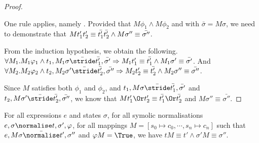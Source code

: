 \begin{proof}
{  }

  {One rule applies, namely .
  Provided that $M\phi_1\land M\phi_2$ and  with $\bar{\sigma}=M\sigma$,
  we need to demonstrate that $M t_1'\relax t_2'\equiv \bar{t_1'}\relax\bar{t_2'} \land M\sigma''\equiv \bar{\sigma''}$.

  From the induction hypothesis, we obtain the following.
  $\forall M_1 . M_1 \phi_1 \land t_1,M_1\sigma \bar{\stride} \bar{t_1'},\bar{\sigma'}\implies M_1 t_1'\equiv\bar{t_1'}\land M_1\sigma' \equiv \bar{\sigma'}$. And \\
  $\forall M_2 . M_2 \phi_2 \land t_2,M_2\sigma' \bar{\stride} \bar{t_2'},\bar{\sigma''}\implies M_2 t_2'\equiv\bar{t_2'}\land M_2\sigma'' \equiv \bar{\sigma''}$.

  Since $M$ satisfies both $\phi_1$ and $\phi_2$, and $t_1,M\sigma \bar{\stride} \bar{t_1'},\bar{\sigma'}$ and $t_2,M\sigma'\bar{\stride}\bar{t_2'},\bar{\sigma''}$,
  we know that $M t_1'\Or t_2'\equiv \bar{t_1'}\Or\bar{t_2'}$ and $M\sigma''\equiv \bar{\sigma''}$.

  }

\end{proof}

\begin{lemma}
  \label{lem:soundnorm}

  For all expressions $e$ and states $\sigma$,
  for all symolic normalisations $e,\sigma\normalise t,\sigma',\phi$,
  for all mappings $M=[s_0\mapsto c_0,\cdots,s_n\mapsto c_n]$
  such that $e,M \sigma \bar{\normalise}t',\sigma''$ and $\phi M =\True$,
  we have $t M \equiv t' \wedge \sigma' M \equiv \sigma''$.

\end{lemma}

